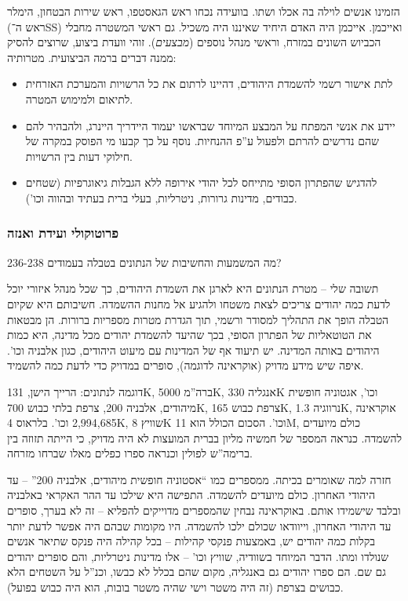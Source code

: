 \documentclass[]{article}
\theoremstyle{definition}
\begin{document}
	הזמינו אנשים לוילה בה אכלו ושתו. בוועידה נכחו ראש הגאסטפו, ראש שירות הבטחון, הימלר (ראש ה־SS) ואייכמן. אייכמן היה האדם היחיד שאיננו היה משכיל. גם ראשי המשטרה מחבלי הכביוש השונים במזרח, וראשי מנהל נוספים (\textit{מבצעים}). זוהי וועדת ביצוע, שרוצים להסיק ממנה דברים ברמה הביצועית. מטרותיה: 
	\begin{itemize}
		\item לתת אישור רשמי להשמדת היהודים, דהיינו לרתום את כל הרשויות והמערכת האזרחית לתיאום ולמימוש המטרה. 
		\item יידע את אנשי המפתח על המבצע המיוחד שבראשו יעמוד היידריך היינרג, ולהבהיר להם שהם נדרשים להרתם ולפעול ע''פ ההנחיות. נוסף על כך קבעו מי הפוסק במקרה של חילוקי דעות בין הרשויות. 
		\item להדגיש שהפתרון הסופי מתייחס לכל יהודי אירופה ללא הגבלות גיאוגרפיות (שטחים כבודים, מדינות גרורות, ניטרליות, בעלי ברית בעתיד ובהווה וכו'). 
	\end{itemize}
	
	\subsubsection{פרוטוקולי ועידת ואנזה}
	מה המשמעות והחשיבות של הנתונים בטבלה בעמודים 236-238? 
	
	תשובה שלי – מטרת הנתונים היא לארגן את השמדת היהודים, כך שכל מנהל איזורי יוכל לדעת כמה יהודים צריכים לצאת משטחו ולהגיע אל מחנות ההשמדה. חשיבותם היא שקיום הטבלה הופך את התהליך למסודר ורשמי, תוך הגדרת מטרות מספריות ברורות. הן מבטאות את הטוטאליות של הפתרון הסופי, בכך שהיעד להשמדת יהודים מכל מדינה, היא כמות היהודים באותה המדינה. יש תיעוד אף של המדינות עם מיעוט היהודים, כגון אלבניה וכו'. איפה שיש מידע מדויק (אוקראינה לדוגמה), סופרים במדויק כדי לדעת כמה להשמיד. 
	
	דוגמה לנתונים: הרייך הישן, 131K, ברה''מ 5000K, אנגליה 330K וכו', אגטוניה חופשית מיהודים, אלבניה 200, צרפת בלתי כבוש 700K, צרפת כבוש 165K, נרווגיה 1.3K, אוקראינה 2,994,685 וכו'. בלראוס 4K, שוויץ 8K וכו'. הסכום הכולל הוא 11M, כולם מיועדים להשמדה. כנראה המספר של חמשיה מליון בברית המועצות לא היה מדויק, כי הייתה תזוזה בין ברימה''ש לפולין וכנראה ספרו כפלים מאלו שברחו מזרחה. 
	
	חזרה למה שאומרים בכיתה. ממספרים כמו ``אסטוניה חופשית מיהודים, אלבניה 200'' – עד היהודי האחרון. כולם מיועדים להשמדה. התפישה היא שילכו עד ההר האקראי באלבניה ובלבד שישמידו אותם. באוקראינה נבחין שהמספרים מדוייקים להפליא – זה לא בערך, סופרים עד היהודי האחרון, וייוודאו שכולם ילכו להשמדה. היו מקומות שבהם היה אפשר לדעת יותר בקלות כמה יהודים יש, באמצעות פנקסי קהילות – בכל קהילה היה פנקס שתיאר אנשים שנולדו ומתו. הדבר המיוחד בשוודיה, שוויץ וכו' – אלו מדינות ניטרליות, והם סופרים יהודים גם שם. הם ספרו יהודים גם באנגליה, מקום שהם בכלל לא כבשו, וכנ''ל על השטחים הלא כבושים בצרפת (זה היה משטר וישי שהיה משטר בובות, הוא היה כבוש בפועל). 
	
\end{document}
